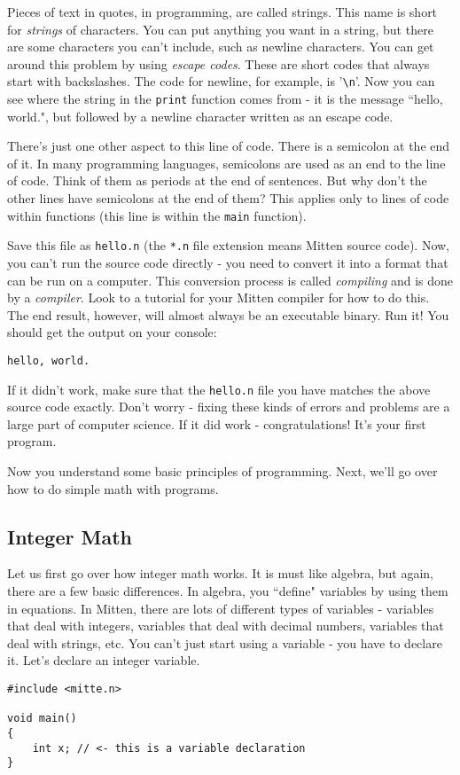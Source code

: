 \documentclass[10pt,a4paper]{article}
\begin{document}
Pieces of text in quotes, in programming, are called strings. This name is short for \textit{strings} of characters. You can put anything you want in a string, but there are some characters you can't include, such as newline characters. You can get around this problem by using \textit{escape codes}. These are short codes that always start with backslashes. The code for newline, for example, is '\verb|\n|'. Now you can see where the string in the \verb|print| function comes from - it is the message ``hello, world.", but followed by a newline character written as an escape code.

There's just one other aspect to this line of code. There is a semicolon at the end of it. In many programming languages, semicolons are used as an end to the line of code. Think of them as periods at the end of sentences. But why don't the other lines have semicolons at the end of them? This applies only to lines of code within functions (this line is within the \verb|main| function).

Save this file as \verb|hello.n| (the \verb|*.n| file extension means Mitten source code). Now, you can't run the source code directly - you need to convert it into a format that can be run on a computer. This conversion process is called \textit{compiling} and is done by a \textit{compiler}. Look to a tutorial for your Mitten compiler for how to do this. The end result, however, will almost always be an executable binary. Run it! You should get the output on your console:
\begin{verbatim}
hello, world.
\end{verbatim}

If it didn't work, make sure that the \verb|hello.n| file you have matches the above source code exactly. Don't worry - fixing these kinds of errors and problems are a large part of computer science. If it did work - congratulations! It's your first program.

Now you understand some basic principles of programming. Next, we'll go over how to do simple math with programs.

\newpage




\subsection{Integer Math}
Let us first go over how integer math works. It is must like algebra, but again, there are a few basic differences. In algebra, you ``define" variables by using them in equations. In Mitten, there are lots of different types of variables - variables that deal with integers, variables that deal with decimal numbers, variables that deal with strings, etc. You can't just start using a variable - you have to declare it. Let's declare an integer variable.
\begin{verbatim}
#include <mitte.n>

void main()
{
    int x; // <- this is a variable declaration
}
\end{verbatim}
\end{document}
